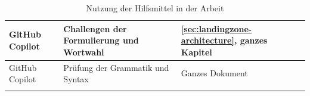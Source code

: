\begin{longtable}{|
  L{3cm}|
  p{\dimexpr(\textwidth-3cm-6\arrayrulewidth)/2}|
  p{\dimexpr(\textwidth-3cm-6\arrayrulewidth)/2}|
}
    GitHub Copilot &
    Challengen der Formulierung und Wortwahl &
    \autoref{sec:landingzone-architecture}, ganzes Kapitel \newline
    \\
    \hline

    GitHub Copilot &
    Prüfung der Grammatik und Syntax &
    Ganzes Dokument
    \\
    \hline


    \caption{Nutzung der Hilfsmittel in der Arbeit}
    \label{tab:support-tools-usage}
\end{longtable}